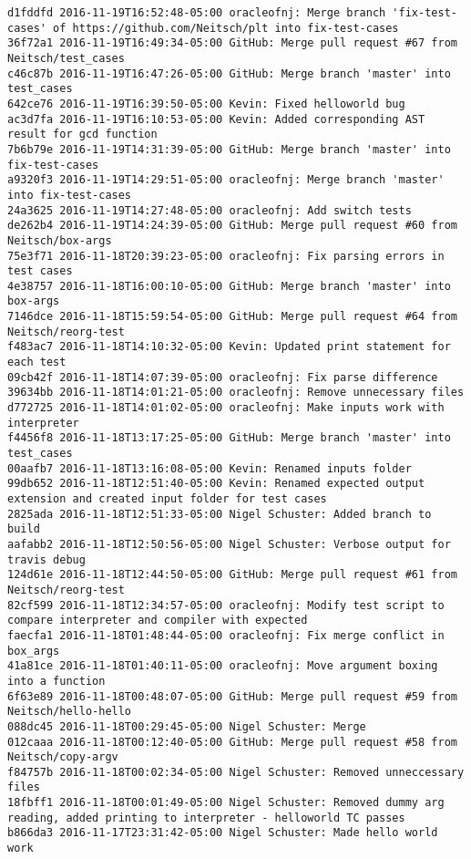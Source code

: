 \begin{lstlisting}
d1fddfd 2016-11-19T16:52:48-05:00 oracleofnj: Merge branch 'fix-test-cases' of https://github.com/Neitsch/plt into fix-test-cases
36f72a1 2016-11-19T16:49:34-05:00 GitHub: Merge pull request #67 from Neitsch/test_cases
c46c87b 2016-11-19T16:47:26-05:00 GitHub: Merge branch 'master' into test_cases
642ce76 2016-11-19T16:39:50-05:00 Kevin: Fixed helloworld bug
ac3d7fa 2016-11-19T16:10:53-05:00 Kevin: Added corresponding AST result for gcd function
7b6b79e 2016-11-19T14:31:39-05:00 GitHub: Merge branch 'master' into fix-test-cases
a9320f3 2016-11-19T14:29:51-05:00 oracleofnj: Merge branch 'master' into fix-test-cases
24a3625 2016-11-19T14:27:48-05:00 oracleofnj: Add switch tests
de262b4 2016-11-19T14:24:39-05:00 GitHub: Merge pull request #60 from Neitsch/box-args
75e3f71 2016-11-18T20:39:23-05:00 oracleofnj: Fix parsing errors in test cases
4e38757 2016-11-18T16:00:10-05:00 GitHub: Merge branch 'master' into box-args
7146dce 2016-11-18T15:59:54-05:00 GitHub: Merge pull request #64 from Neitsch/reorg-test
f483ac7 2016-11-18T14:10:32-05:00 Kevin: Updated print statement for each test
09cb42f 2016-11-18T14:07:39-05:00 oracleofnj: Fix parse difference
39634bb 2016-11-18T14:01:21-05:00 oracleofnj: Remove unnecessary files
d772725 2016-11-18T14:01:02-05:00 oracleofnj: Make inputs work with interpreter
f4456f8 2016-11-18T13:17:25-05:00 GitHub: Merge branch 'master' into test_cases
00aafb7 2016-11-18T13:16:08-05:00 Kevin: Renamed inputs folder
99db652 2016-11-18T12:51:40-05:00 Kevin: Renamed expected output extension and created input folder for test cases
2825ada 2016-11-18T12:51:33-05:00 Nigel Schuster: Added branch to build
aafabb2 2016-11-18T12:50:56-05:00 Nigel Schuster: Verbose output for travis debug
124d61e 2016-11-18T12:44:50-05:00 GitHub: Merge pull request #61 from Neitsch/reorg-test
82cf599 2016-11-18T12:34:57-05:00 oracleofnj: Modify test script to compare interpreter and compiler with expected
faecfa1 2016-11-18T01:48:44-05:00 oracleofnj: Fix merge conflict in box_args
41a81ce 2016-11-18T01:40:11-05:00 oracleofnj: Move argument boxing into a function
6f63e89 2016-11-18T00:48:07-05:00 GitHub: Merge pull request #59 from Neitsch/hello-hello
088dc45 2016-11-18T00:29:45-05:00 Nigel Schuster: Merge
012caaa 2016-11-18T00:12:40-05:00 GitHub: Merge pull request #58 from Neitsch/copy-argv
f84757b 2016-11-18T00:02:34-05:00 Nigel Schuster: Removed unneccessary files
18fbff1 2016-11-18T00:01:49-05:00 Nigel Schuster: Removed dummy arg reading, added printing to interpreter - helloworld TC passes
b866da3 2016-11-17T23:31:42-05:00 Nigel Schuster: Made hello world work

\end{lstlisting}
